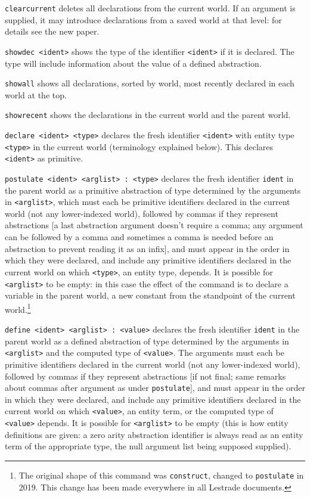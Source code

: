 {\tt clearcurrent} deletes all declarations from the current world.  If an argument is supplied, it may introduce declarations from a saved world at that level:  for details see the new paper.

{\tt showdec <ident>}  shows the type of the identifier {\tt <ident>} if it is declared.   The type will include information about the value of a defined abstraction.

{\tt showall}  shows all declarations, sorted by world, most recently declared in each world at the top.

{\tt showrecent} shows the declarations in the current world and the parent world.

{\tt declare <ident> <type>}  declares the fresh identifier {\tt <ident>} with entity type {\tt <type>} in the current world (terminology explained below).  This declares {\tt <ident>} as primitive.

{\tt postulate <ident> <arglist> : <type>}  declares the fresh identifier {\tt ident} in the parent world as a primitive abstraction of type determined by the arguments in {\tt <arglist>}, which must each
be primitive identifiers declared in the current world (not any lower-indexed world), followed by commas if they represent abstractions [a last abstraction argument doesn't require a comma; any argument can be followed by a comma and sometimes a comma is needed before an abstraction to prevent reading it as an infix],  and must appear in the order in which they were declared, and include any primitive identifiers declared in the current world on which {\tt <type>}, an entity type, depends.   It is possible for {\tt <arglist>} to be empty:  in this case the effect of the command is to declare a variable in the parent world, a new constant from the standpoint of the current world.\footnote{The original shape of this command was {\tt construct}, changed to {\tt postulate} in 2019.  This change has been made everywhere in all Lestrade documents.}

{\tt define <ident> <arglist> : <value>}  declares the fresh identifier {\tt ident} in the parent world as a defined abstraction of type determined by the arguments in {\tt <arglist>} and the computed type of {\tt <value>}.   The arguments must each
be primitive identifiers declared in the current world (not any lower-indexed world), followed by commas if they represent abstractions [if not final; same remarks about commas after argument as under {\tt postulate}],  and must appear in the order in which they were declared, and include any primitive identifiers declared in the current world on which {\tt <value>}, an entity term, or the computed type of {\tt <value>} depends.   It is possible for {\tt <arglist>} to be empty (this is how entity definitions are given:  a zero arity abstraction identifier is always read as an entity term of the appropriate type, the null argument list being supposed supplied).


